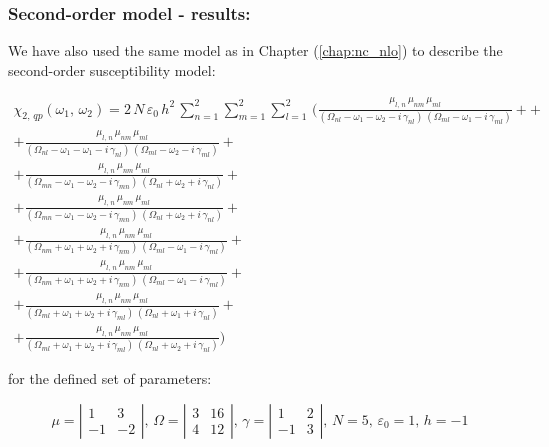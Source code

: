 \documentclass[12pt,twoside,a4paper]{article}
\numberwithin{equation}{subsection}
\numberwithin{figure}{subsection}
\begin{document}
\subsubsection*{Second-order model - results:}

We have also used the same model as in Chapter (\ref{chap:nc_nlo}) to describe the second-order susceptibility model:

\begin{multline} \label{hcc_qp2}
  \chi_{2, \,qp}({\omega_{1}}, \,{\omega_{2}}) = 
  2\,N\,\varepsilon_{0}\,h^{2}\,\sum_{n=1}^{2}\sum_{m=1}^{2}\sum_{l=1}^{2}\,
  (
       \frac {{\mu_{l,\,n}}\,{\mu_{nm}}\,{\mu_{ml}}}
      {({\Omega_{nl}} - \omega_1 - \omega_2 - i\,{\gamma_{nl}})\,({\Omega_{ml}} - \omega_1 - i\,{\gamma_{ml}})} +
+ \\ + \frac {{\mu_{l, \,n}}\,{\mu_{nm}}\,{\mu_{ml}}}
      {({\Omega_{nl}} - \omega_1 - \omega_1 - i\,{\gamma_{nl}})\,({\Omega_{ml}} - \omega_2 - i\,{\gamma_{ml}})}
+ \\ + \frac {{\mu_{l, \,n}}\,{\mu_{nm}}\,{\mu_{ml}}}
      {({\Omega_{mn}} - \omega_1 - \omega_2 - i\,{\gamma_{mn}})\,({\Omega_{nl}} + \omega_2 + i\,{\gamma_{nl}})}
+ \\ + \frac {{\mu_{l, \,n }}\,{\mu_{nm}}\,{\mu_{ml}}} 
      {({\Omega_{mn}} - \omega_1 - \omega_2 - i\,{\gamma_{mn}})\,({\Omega_{nl}} + \omega_2 + i\,{\gamma_{nl}})} 
+ \\ + \frac {{\mu_{l, \,n}}\,{\mu_{nm}}\,{\mu_{ml}}}
      {({\Omega_{nm}} + \omega_1 + \omega_2 + i\,{\gamma_{nm}})\,({\Omega_{ml}} - \omega_1 - i\,{\gamma_{ml}})}
+\\ + \frac {{\mu_{l, \,n}}\,{\mu_{ nm}}\,{\mu_{ml}}}
      {({\Omega_{nm}} + \omega_1 + \omega_2 + i\,{\gamma_{nm}})\,({\Omega_{ml}} - \omega_1 - i\,{\gamma_{ml}})} 
+ \\ + \frac {{\mu_{l, \,n}}\,{\mu_{nm}}\,{\mu_{ml}}}
      {({\Omega_{ml}} + \omega_1 + \omega_2 + i\,{\gamma_{ml}})\,({\Omega_{nl}} + \omega_1 + i\,{\gamma_{nl}})}
+\\ + \frac {{\mu_{l, \,n}}\,{\mu_{nm}}\,{\mu_{ml}}}
      {({\Omega_{ml}} + \omega_1 + \omega_2 + i\,{\gamma_{ml}})\,({\Omega_{nl}} + \omega_2 + i\,{\gamma_{nl}})}
  )  
\end{multline}

for the defined set of parameters:

\begin{equation}
	\mu = \left| \begin{array}{cc} 
    1 & 3 \\ -1 & -2 
  \end{array} \right|, \, 
  \Omega = \left| \begin{array}{cc} 
    3 & 16 \\ 4 & 12 
  \end{array} \right|, \,
  \gamma = \left| \begin{array}{cc} 
  1 & 2 \\ -1 & 3
  \end{array} \right|, \,
  N = 5, \, 
  \varepsilon_0 = 1, \,
  h= - 1
\end{equation}
\end{document}
